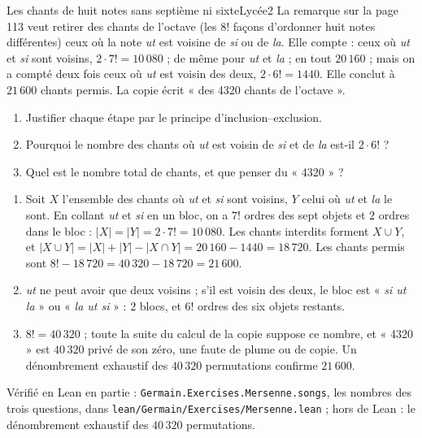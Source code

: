 \documentclass[11pt,a4paper]{article}
\begin{document}
\begin{exercice}{Les chants de huit notes sans septième ni sixte}{Lycée}{2}
La remarque sur la page 113 veut retirer des chants de l'octave (les $8!$ façons
d'ordonner huit notes différentes) ceux où la note \emph{ut} est voisine de
\emph{si} ou de \emph{la}. Elle compte : ceux où \emph{ut} et \emph{si} sont
voisins, $2\cdot 7! = 10\,080$ ; de même pour \emph{ut} et \emph{la} ; en tout
$20\,160$ ; mais on a compté deux fois ceux où \emph{ut} est voisin des deux,
$2\cdot 6! = 1440$. Elle conclut à $21\,600$ chants permis. La copie écrit « des
4320 chants de l'octave ».
\begin{enumerate}
\item Justifier chaque étape par le principe d'inclusion--exclusion.
\item Pourquoi le nombre des chants où \emph{ut} est voisin de \emph{si} et de
  \emph{la} est-il $2 \cdot 6!$ ?
\item Quel est le nombre total de chants, et que penser du « 4320 » ?
\end{enumerate}
\end{exercice}

\begin{solution}
\begin{enumerate}
\item Soit $X$ l'ensemble des chants où \emph{ut} et \emph{si} sont voisins, $Y$
  celui où \emph{ut} et \emph{la} le sont. En collant \emph{ut} et \emph{si} en un
  bloc, on a $7!$ ordres des sept objets et $2$ ordres dans le bloc :
  $|X| = |Y| = 2\cdot7! = 10\,080$. Les chants interdits forment $X \cup Y$, et
  $|X\cup Y| = |X| + |Y| - |X\cap Y| = 20\,160 - 1440 = 18\,720$. Les chants permis
  sont $8! - 18\,720 = 40\,320 - 18\,720 = 21\,600$.
\item \emph{ut} ne peut avoir que deux voisins ; s'il est voisin des deux, le bloc
  est « \emph{si ut la} » ou « \emph{la ut si} » : $2$ blocs, et $6!$ ordres des six
  objets restants.
\item $8! = 40\,320$ ; toute la suite du calcul de la copie suppose ce nombre, et
  « 4320 » est $40\,320$ privé de son zéro, une faute de plume ou de copie. Un
  dénombrement exhaustif des $40\,320$ permutations confirme $21\,600$.
\end{enumerate}

Vérifié en Lean en partie : \texttt{Germain.Exercises.Mersenne.songs}, les nombres des trois
questions, dans \texttt{lean/Germain/Exercises/Mersenne.lean} ; hors de Lean : le dénombrement exhaustif des
$40\,320$ permutations.
\end{solution}
\end{document}
